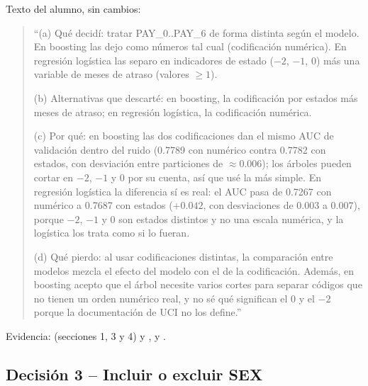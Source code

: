 Texto del alumno, sin cambios:
\begin{quote}
``(a) Qué decidí: tratar PAY\_0..PAY\_6 de forma distinta según el modelo. En
boosting las dejo como números tal cual (codificación numérica). En
regresión logística las separo en indicadores de estado ($-2$, $-1$, $0$)
más una variable de meses de atraso (valores $\ge 1$).

(b) Alternativas que descarté: en boosting, la codificación por estados más
meses de atraso; en regresión logística, la codificación numérica.

(c) Por qué: en boosting las dos codificaciones dan el mismo AUC de
validación dentro del ruido (0.7789 con numérico contra 0.7782 con
estados, con desviación entre particiones de $\approx 0.006$); los árboles
pueden cortar en $-2$, $-1$ y $0$ por su cuenta, así que usé la más simple.
En regresión logística la diferencia sí es real: el AUC pasa de 0.7267
con numérico a 0.7687 con estados ($+0.042$, con desviaciones de
$0.003$ a $0.007$), porque $-2$, $-1$ y $0$ son estados distintos y no una
escala numérica, y la logística los trata como si lo fueran.

(d) Qué pierdo: al usar codificaciones distintas, la comparación entre
modelos mezcla el efecto del modelo con el de la codificación. Además,
en boosting acepto que el árbol necesite varios cortes para separar
códigos que no tienen un orden numérico real, y no sé qué significan
el 0 y el $-2$ porque la documentación de UCI no los define.''
\end{quote}
Evidencia:  (secciones 1, 3 y 4) y
,
 y .

\subsection*{Decisión 3 -- Incluir o excluir SEX}

